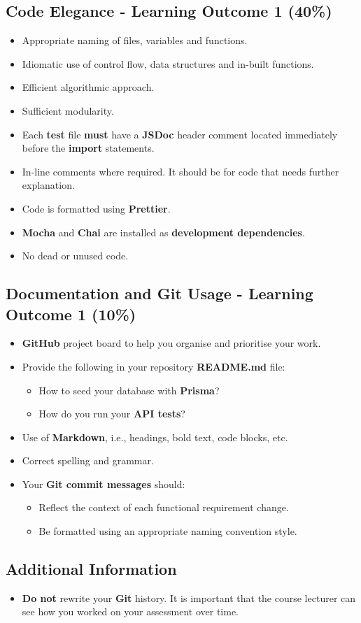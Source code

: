 \documentclass{article}
\begin{document}
\subsection*{Code Elegance - Learning Outcome 1 (40\%)}
\begin{itemize}
  \item Appropriate naming of files, variables and functions.
	\item Idiomatic use of control flow, data structures and in-built functions.
  \item Efficient algorithmic approach.
  \item Sufficient modularity.
	\item Each \textbf{test} file \textbf{must} have a \textbf{JSDoc} header comment located immediately before the \textbf{import} statements.
  \item In-line comments where required. It should be for code that needs further explanation.
	\item Code is formatted using \textbf{Prettier}.
	\item \textbf{Mocha} and \textbf{Chai} are installed as \textbf{development dependencies}.	
  \item No dead or unused code.
\end{itemize}

\subsection*{Documentation and Git Usage - Learning Outcome 1 (10\%)}
\begin{itemize}
  \item \textbf{GitHub} project board to help you organise and prioritise your work. 
    \item Provide the following in your repository \textbf{README.md} file:
    \begin{itemize} 
      \item How to seed your database with \textbf{Prisma}?
      \item How do you run your \textbf{API tests}?
    \end{itemize}
    \item Use of \textbf{Markdown}, i.e., headings, bold text, code blocks, etc.
    \item Correct spelling and grammar.
    \item Your \textbf{Git commit messages} should:
    \begin{itemize}
      \item Reflect the context of each functional requirement change.
      \item Be formatted using an appropriate naming convention style.
    \end{itemize}	
\end{itemize}
          
\subsection*{Additional Information}
\begin{itemize}
    \item \textbf{Do not} rewrite your \textbf{Git} history. It is important that the course lecturer can see how you worked on your assessment over time. 
\end{itemize} 
\end{document}
